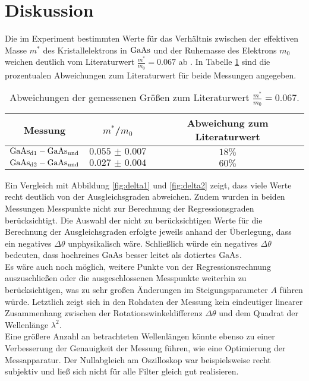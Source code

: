 \section{Diskussion}
\label{sec:Diskussion}
Die im Experiment bestimmten Werte für das Verhältnis zwischen der effektiven Masse $m^{*}$ des Kristallelektrons in $\ce{GaAs}$ und der Ruhemasse des Elektrons $m_{0}$ weichen deutlich vom Literaturwert
$\frac{m^{*}}{m_{0}}=0.067$ ab \cite{eff_mass}. In Tabelle \ref{tab:diskussion} sind die prozentualen Abweichungen zum Literaturwert für beide Messungen angegeben.
\begin{table}
  \centering
  \caption{Abweichungen der gemessenen Größen zum Literaturwert $\frac{m^{*}}{m_{0}}=0.067$.}
  \label{tab:diskussion}
  \begin{tabular}{ccc}
    \toprule
    Messung&$m^{*}$/$m_{0}$&Abweichung zum Literaturwert\\
    \midrule
    $\ce{GaAs}_{\mathrm{d1}}-\ce{GaAs}_{\mathrm{und}}$&$\num{0.055(7)}$&$18\%$\\
    $\ce{GaAs}_{\mathrm{d2}}-\ce{GaAs}_{\mathrm{und}}$&$\num{0.027(4)}$&$60\%$\\
    \bottomrule
  \end{tabular}
\end{table}
Ein Vergleich mit Abbildung \ref{fig:delta1} und \ref{fig:delta2} zeigt, dass viele Werte recht deutlich von der Ausgleichsgraden abweichen. Zudem wurden in beiden Messungen Messpunkte nicht zur Berechnung der Regressionsgraden berücksichtigt. Die Auswahl der nicht zu berücksichtigen Werte für die Berechnung der Ausgleichsgraden erfolgte jeweils anhand der Überlegung, dass ein negatives $\Delta\theta$ unphysikalisch wäre. Schließlich würde ein negatives $\Delta\theta$ bedeuten, dass hochreines $\ce{GaAs}$ besser leitet als dotiertes $\ce{GaAs}$.\\
Es wäre auch noch möglich, weitere Punkte von der Regressionsrechnung auszuschließen oder die ausgeschlossenen Messpunkte weiterhin zu berücksichtigen, was zu sehr großen Änderungen im Steigungsparameter $A$ führen würde.
Letztlich zeigt sich in den Rohdaten der Messung kein eindeutiger linearer Zusammenhang zwischen der Rotationswinkeldifferenz $\Delta\theta$ und dem Quadrat der Wellenlänge $\lambda^{2}$.\\
Eine größere Anzahl an betrachteten Wellenlängen könnte ebenso zu einer Verbesserung der Genauigkeit der Messung führen, wie eine Optimierung der Messapparatur.
Der Nullabgleich am Oszilloskop war beispielsweise recht subjektiv und ließ sich nicht für alle Filter gleich gut realisieren.
